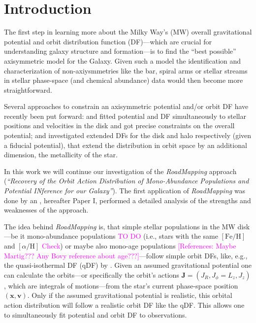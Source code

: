 \documentclass[iop,revtex4,numberedappendix,appendixfloats]{emulateapj}
\newcommand{\vect}[1]{\boldsymbol{#1}}
\newcommand{\RM}{{\sl RoadMapping}}
\newcommand{\Wilma}[1]{\textcolor{Magenta}{#1}}
\begin{document}
\section{Introduction}

The first step in learning more about the Milky Way's (MW) overall gravitational potential and orbit distribution function (DF)---which are crucial for understanding galaxy structure and formation---is to find the ``best possible'' axisymmetric model for the Galaxy. Given such a model the identification and characterization of non-axiysmmetries like the bar, spiral arms or stellar streams in stellar phase-space (and chemical abundance) data would then become more straightforward.

Several approaches to constrain an axisymmetric potential and/or orbit DF have recently been put forward: \citet{2013ApJ...779..115B} and \citet{2014MNRAS.445.3133P} fitted potential and DF simultaneously to stellar positions and velocities in the disk and got precise constraints on the overall potential; \citet{2015MNRAS.449.3479S} and \citet{2016MNRAS.tmp..817D} investigated extended DFs for the disk and halo respectively (given a fiducial potential), that extend the distribution in orbit space by an additional dimension, the metallicity of the star. 

In this work we will continue our investigation of the \RM{} approach (\emph{``Recovery of the Orbit Action Distribution of Mono-Abundance Populations and Potential INference for our Galaxy''}). The first application of \RM{} was done by \citet{2013ApJ...779..115B} an \citet{Trick 2016}, hereafter Paper I, performed a detailed analysis of the strengths and weaknesses of the approach. 

The idea behind \RM{} is, that simple stellar populations in the MW disk---be it mono-abundance populations \citep{Bovyabcd, ting} \Wilma{TO DO} (i.e., stars with the same $[\mathrm{Fe}/\mathrm{H}]$ and $[\alpha/\mathrm{H}]$ \Wilma{Check}) or maybe also mono-age populations \Wilma{[References: Maybe Martig??? Any Bovy reference about age???]}---follow simple orbit DFs, like, e.g., the quasi-isothermal DF (qDF) by \citet{???}. Given an assumed gravitational potential one can calculate the orbits---or specifically the orbit's actions $\vect{J}=(J_R,J_\phi=L_z,J_z)$, which are integrals of motions---from the star's current phase-space position $(\vect{x},\vect{v})$. Only if the assumed gravitational potential is realistic, this orbital action distribution will follow a realistic orbit DF like the qDF. This allows one to simultaneously fit potential and orbit DF to observations.
\end{document}
